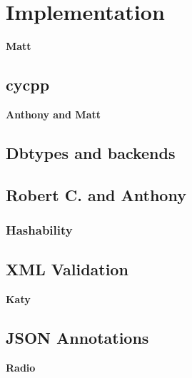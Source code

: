 \section{Implementation}

\textbf{Matt}

\subsection{cycpp}

\textbf{Anthony and Matt}

\subsection{Dbtypes and backends}

\subsection{Robert C. and Anthony}

\subsubsection{Hashability}

\subsection{XML Validation}

\textbf{Katy}

\subsection{JSON Annotations}

\textbf{Radio}

